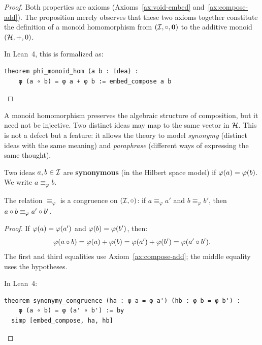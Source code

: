 \begin{proof}
Both properties are axioms (Axioms~\ref{ax:void-embed} and~\ref{ax:compose-add}).
The proposition merely observes that these two axioms together constitute the
definition of a monoid homomorphism from $(\mathcal{I}, \circ, \mathbf{0})$ to the
additive monoid $(\mathcal{H}, +, 0)$.

In Lean~4, this is formalized as:
\begin{lstlisting}
theorem phi_monoid_hom (a b : Idea) :
    φ (a ∘ b) = φ a + φ b := embed_compose a b
\end{lstlisting}
\end{proof}

A monoid homomorphism preserves the algebraic structure of composition, but it
need not be injective. Two distinct ideas may map to the same vector in
$\mathcal{H}$. This is not a defect but a feature: it allows the theory to model
\emph{synonymy} (distinct ideas with the same meaning) and \emph{paraphrase}
(different ways of expressing the same thought).

\begin{definition}[Synonymy]
\label{def:synonymy}
Two ideas $a, b \in \mathcal{I}$ are \textbf{synonymous} (in the Hilbert space model)
if $\varphi(a) = \varphi(b)$. We write $a \equiv_\varphi b$.
\end{definition}

\begin{proposition}
\label{prop:synonymy-congruence}
The relation $\equiv_\varphi$ is a congruence on $(\mathcal{I}, \circ)$: if $a
\equiv_\varphi a'$ and $b \equiv_\varphi b'$, then $a \circ b \equiv_\varphi
a' \circ b'$.
\end{proposition}

\begin{proof}
If $\varphi(a) = \varphi(a')$ and $\varphi(b) = \varphi(b')$, then:
\[
  \varphi(a \circ b) = \varphi(a) + \varphi(b) = \varphi(a') + \varphi(b')
  = \varphi(a' \circ b').
\]
The first and third equalities use Axiom~\ref{ax:compose-add}; the middle
equality uses the hypotheses.

In Lean~4:
\begin{lstlisting}
theorem synonymy_congruence (ha : φ a = φ a') (hb : φ b = φ b') :
    φ (a ∘ b) = φ (a' ∘ b') := by
  simp [embed_compose, ha, hb]
\end{lstlisting}
\end{proof}

